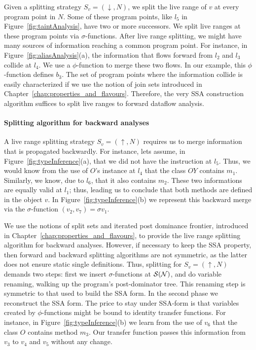 Given a splitting strategy $S_v = (\downarrow, N)$, we split the live
range of $v$ at every program point in $N$.
Some of these program points, like $l_5$ in Figure~\ref{fig:taintAnalysis}, 
have two or more successors.
We split live ranges at these program points via $\sigma$-functions.
After live range splitting, we might have many sources of information
reaching a common program point.
For instance, in Figure~\ref{fig:aliasAnalysis}(a), the information that flows
forward from $l_2$ and $l_3$ collide at $l_4$.
We use a $\phi$-function to merge these two flows.
In our example, this $\phi$-function defines $b_3$.
The set of program points where the information collide is easily characterized
if we use the notion of join sets introduced in
Chapter~\ref{chap:properties_and_flavours}.
Therefore, the very SSA construction algorithm suffices to split live ranges
to forward dataflow analysis.

\paragraph{Splitting algorithm for backward analyses}

A live range splitting strategy $S_v = (\uparrow, N)$ requires us to merge
information that is propagated backwardly.
For instance, lets assume, in Figure~\ref{fig:typeInference}(a), that we did
not have the instruction at $l_5$.
Thus, we would know from the use of $O$'s instance at $l_4$ that the class
$OY$ contains $m_1$.
Similarly, we know, due to $l_6$, that it also contains $m_2$.
These two informations are equally valid at $l_1$; thus, leading us to conclude
that both methods are defined in the object $v$.
In Figure~\ref{fig:typeInference}(b) we represent this backward merge via the
$\sigma$-function $(v_2, v_7) =\sigma v_1$.

We use the notions of split sets and iterated post
dominance frontier, introduced in Chapter~\ref{chap:properties_and_flavours},
to provide the live range splitting algorithm for backward analyses.
However, if necessary to keep the SSA property, then forward and backward
splitting algorithms are not symmetric, as the latter does not ensure
static single definitions.
Thus, splitting for $S_v = (\uparrow, N)$ demands two steps: first we insert
$\sigma$-functions at $\cal{S}(N)$, and do variable renaming, walking up the
program's post-dominator tree.
This renaming step is symmetric to that used to build the SSA form.
In the second phase we reconstruct the SSA form.
The price to stay under SSA-form is that variables created by $\phi$-functions
might be bound to identity transfer functions.
For instance, in Figure~\ref{fig:typeInference}(b) we learn from the use of
$v_6$ that the class $O$ contains method $m_3$.
Our transfer function passes this information from $v_3$ to $v_4$ and $v_5$
without any change.

